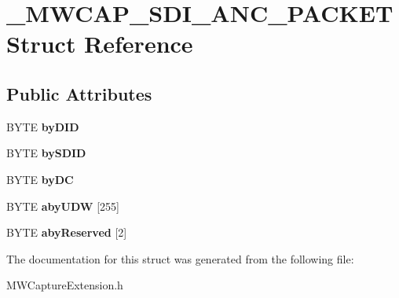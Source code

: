 \hypertarget{struct__MWCAP__SDI__ANC__PACKET}{\section{\-\_\-\-M\-W\-C\-A\-P\-\_\-\-S\-D\-I\-\_\-\-A\-N\-C\-\_\-\-P\-A\-C\-K\-E\-T Struct Reference}
\label{struct__MWCAP__SDI__ANC__PACKET}
}
\subsection*{Public Attributes}
\begin{DoxyCompactItemize}
\item 
\hypertarget{struct__MWCAP__SDI__ANC__PACKET_adc525f82a49d76fd7aead9d44a847e69}{B\-Y\-T\-E {\bfseries by\-D\-I\-D}}\label{struct__MWCAP__SDI__ANC__PACKET_adc525f82a49d76fd7aead9d44a847e69}

\item 
\hypertarget{struct__MWCAP__SDI__ANC__PACKET_af0ba9a64904f5bb2f0cf28e81f8f8f02}{B\-Y\-T\-E {\bfseries by\-S\-D\-I\-D}}\label{struct__MWCAP__SDI__ANC__PACKET_af0ba9a64904f5bb2f0cf28e81f8f8f02}

\item 
\hypertarget{struct__MWCAP__SDI__ANC__PACKET_afda23aef4c37dc54786d9eedcd497efb}{B\-Y\-T\-E {\bfseries by\-D\-C}}\label{struct__MWCAP__SDI__ANC__PACKET_afda23aef4c37dc54786d9eedcd497efb}

\item 
\hypertarget{struct__MWCAP__SDI__ANC__PACKET_a70528e26579a53cb5b6e1b620afeb4e6}{B\-Y\-T\-E {\bfseries aby\-U\-D\-W} \mbox{[}255\mbox{]}}\label{struct__MWCAP__SDI__ANC__PACKET_a70528e26579a53cb5b6e1b620afeb4e6}

\item 
\hypertarget{struct__MWCAP__SDI__ANC__PACKET_ae5604cc18f33c13083c8e238280bb8f7}{B\-Y\-T\-E {\bfseries aby\-Reserved} \mbox{[}2\mbox{]}}\label{struct__MWCAP__SDI__ANC__PACKET_ae5604cc18f33c13083c8e238280bb8f7}

\end{DoxyCompactItemize}


The documentation for this struct was generated from the following file\-:\begin{DoxyCompactItemize}
\item 
M\-W\-Capture\-Extension.\-h\end{DoxyCompactItemize}
